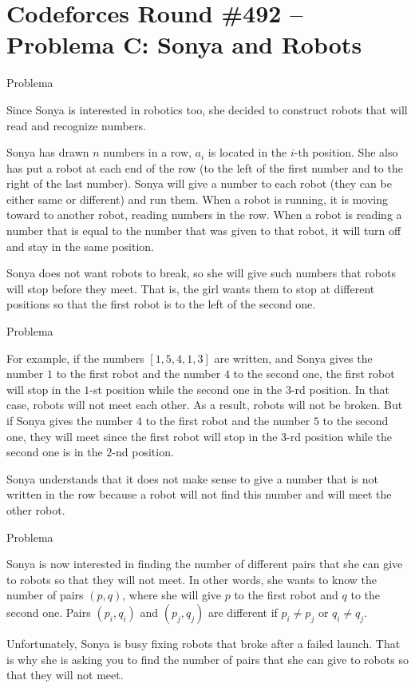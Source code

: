 \section{Codeforces Round \#492 -- Problema C: Sonya and Robots}

\begin{frame}[fragile]{Problema}

Since Sonya is interested in robotics too, she decided to construct robots that will read and recognize numbers.

Sonya has drawn $n$ numbers in a row, $a_i$ is located in the $i$-th position. 
She also has put a robot at each end of the row (to the left of the first number and to the right of the last number). Sonya will give a number to each robot (they can be either same or different) and run them. When a robot is running, it is moving toward to another robot, reading numbers in the row. When a robot is reading a number that is equal to the number that was given to that robot, it will turn off and stay in the same position.

Sonya does not want robots to break, so she will give such numbers that robots will stop before they meet. That is, the girl wants them to stop at different positions so that the first robot is to the left of the second one.

\end{frame}


\begin{frame}[fragile]{Problema}

For example, if the numbers $[1,5,4,1,3]$ are written, and Sonya gives the number $1$ to the first 
robot and the number $4$ to the second one, the first robot will stop in the $1$-st position while the second one in the $3$-rd position. In that case, robots will not meet each other. As a result, robots will not be broken. But if Sonya gives the number $4$ to the first robot and the number $5$ to the second one, they will meet since the first robot will stop in the $3$-rd position while the second one is in the $2$-nd position.

Sonya understands that it does not make sense to give a number that is not written in the row because a robot will not find this number and will meet the other robot.

\end{frame}

\begin{frame}[fragile]{Problema}

Sonya is now interested in finding the number of different pairs that she can give to robots so that they will not meet. In other words, she wants to know the number of pairs $(p, q)$, where she 
will give $p$ to the first robot and $q$ to the second one. Pairs $(p_i, q_i)$ and $(p_j, q_j)$ 
are different if $p_i\neq p_j$ or $q_i\neq q_j$.

Unfortunately, Sonya is busy fixing robots that broke after a failed launch. That is why she is asking you to find the number of pairs that she can give to robots so that they will not meet.

\end{frame}

